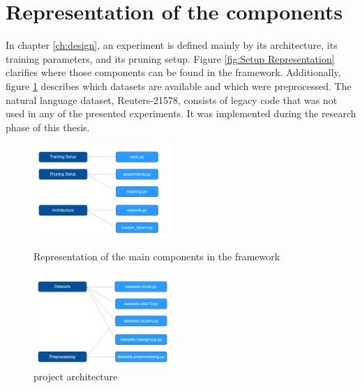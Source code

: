 \section{Representation of the components}
In chapter \ref{ch:design}, an experiment is defined mainly by its architecture, its training parameters, and its pruning setup. Figure \ref{fig:Setup Representation} clarifies where those components can be found in the framework.
Additionally, figure \ref{fig:Dataset Representation} describes which datasets are available and which were preprocessed. The natural language dataset, Reuters-21578, consists of legacy code that was not used in any of the presented experiments. It was implemented during the research phase of this thesis.
\begin{figure}
	\begin{minipage}{0.45\textwidth}
		\centering
		\includegraphics[width=200px]{gfx/chp_5_setups.png}
		\caption{Representation of the main components in the framework}
		\label{fig:Setup Representation}
	\end{minipage}\hfill
	\begin{minipage}{0.45\textwidth}
		\centering
		\includegraphics[width=200px]{gfx/chp_5_datasets.png}
		\caption{project architecture}
		\label{fig:Dataset Representation}
	\end{minipage}
\end{figure}


